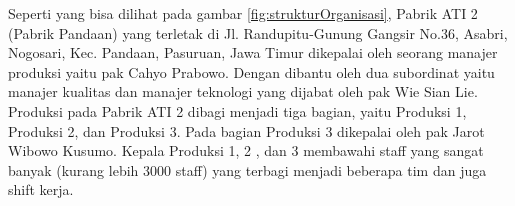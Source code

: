 Seperti yang bisa dilihat pada gambar \ref{fig:strukturOrganisasi}, Pabrik ATI 2 (Pabrik Pandaan) yang terletak di 
Jl. Randupitu-Gunung Gangsir No.36, Asabri, Nogosari, Kec. Pandaan, Pasuruan, Jawa Timur dikepalai oleh seorang 
manajer produksi yaitu pak Cahyo Prabowo. Dengan dibantu oleh dua subordinat yaitu manajer kualitas dan manajer
teknologi yang dijabat oleh pak Wie Sian Lie. Produksi pada Pabrik ATI 2 dibagi menjadi tiga bagian, yaitu Produksi 1, 
Produksi 2, dan Produksi 3. Pada bagian Produksi 3 dikepalai oleh pak Jarot Wibowo Kusumo. Kepala Produksi 1, 2 , dan 3
membawahi staff yang sangat banyak (kurang lebih 3000 staff) yang terbagi menjadi beberapa tim dan juga shift kerja.
\vspace{0.5ex}
